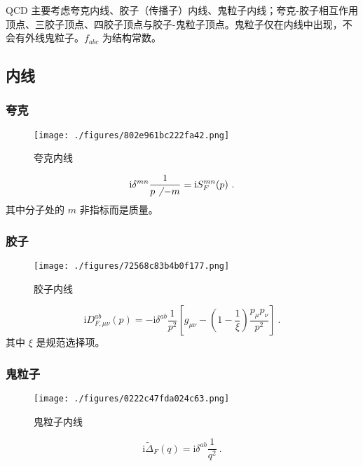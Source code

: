 

\begin{issues}
\issueMissDepend
\issueAbstract
\end{issues}

QCD 主要考虑夸克内线、胶子（传播子）内线、鬼粒子内线；夸克-胶子相互作用顶点、三胶子顶点、四胶子顶点与胶子-鬼粒子顶点。鬼粒子仅在内线中出现，不会有外线鬼粒子。$f_{abc}$ 为结构常数。

\subsection{内线}
\subsubsection{夸克}
\begin{figure}[ht]
\centering
\texttt{[image: ./figures/802e961bc222fa42.png]}
\caption{夸克内线} \label{fig_qcdfey_1}
\end{figure}
\begin{equation}
\mathrm i \delta^{mn} \frac{1}{ p\not ~- m} = \mathrm i S^{mn}_F(p)~.
\end{equation}
其中分子处的 $m$ 非指标而是质量。

\subsubsection{胶子}
\begin{figure}[ht]
\centering
\texttt{[image: ./figures/72568c83b4b0f177.png]}
\caption{胶子内线} \label{fig_qcdfey_2}
\end{figure}
\begin{equation}
\mathrm i D_{F, \mu\nu}^{ab}(p) = -\mathrm i \delta^{ab} \frac{1}{p^2} \left[ g_{\mu\nu} - \left(1-\frac{1}{\xi}\right) \frac{p_\mu p_\nu}{p^2} \right] ~.
\end{equation}
其中 $\xi$ 是规范选择项。

\subsubsection{鬼粒子}
\begin{figure}[ht]
\centering
\texttt{[image: ./figures/0222c47fda024c63.png]}
\caption{鬼粒子内线} \label{fig_qcdfey_3}
\end{figure}
\begin{equation}
\mathrm i \widetilde{\Delta}_F(q) = \mathrm i \delta^{ab} \frac{1}{q^2} ~.
\end{equation}

